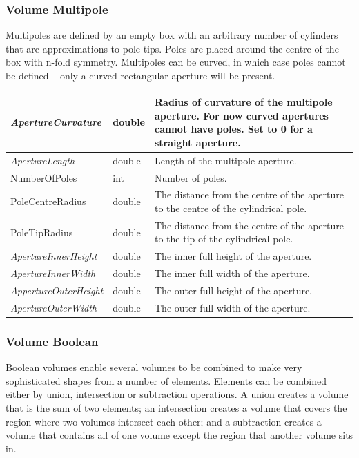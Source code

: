 \subsubsection{Volume Multipole}
Multipoles are defined by an empty box with an arbitrary number of cylinders that are approximations to pole tips. Poles
are placed around the centre of the box with n-fold symmetry. Multipoles can be curved, in which case poles cannot be
defined -- only a curved rectangular aperture will be present.

\begin{center}
\tabletail{}
\tablelasttail{}
\begin{supertabular}{|m{3.892cm}|m{1.333cm}|m{11.77cm}|}
\hline
{\itshape ApertureCurvature} &
double &
Radius of curvature of the multipole aperture. For now curved apertures cannot have poles. Set to 0 for a straight
aperture.\\\hline
{\itshape ApertureLength} &
double &
Length of the multipole aperture.\\\hline
NumberOfPoles &
int &
Number of poles.\\\hline
PoleCentreRadius &
double &
The distance from the centre of the aperture to the centre of the cylindrical pole.\\\hline
PoleTipRadius &
double &
The distance from the centre of the aperture to the tip of the cylindrical pole.\\\hline
{\itshape ApertureInnerHeight} &
double &
The inner full height of the aperture.\\\hline
{\itshape ApertureInnerWidth} &
double &
The inner full width of the aperture.\\\hline
{\itshape AppertureOuterHeight} &
double &
The outer full height of the aperture.\\\hline
{\itshape ApertureOuterWidth} &
double &
The outer full width of the aperture.\\\hline
\end{supertabular}
\end{center}
\subsubsection{Volume Boolean}
Boolean volumes enable several volumes to be combined to make very sophisticated shapes from a number of elements.
Elements can be combined either by union, intersection or subtraction operations. A union creates a volume that is the
sum of two elements; an intersection creates a volume that covers the region where two volumes intersect each other;
and a subtraction creates a volume that contains all of one volume except the region that another volume sits in.


